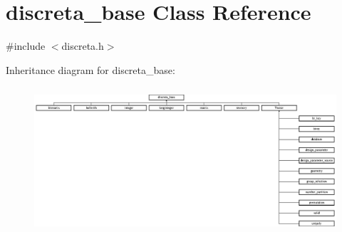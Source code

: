 \hypertarget{classdiscreta__base}{}\section{discreta\+\_\+base Class Reference}
\label{classdiscreta__base}


{\ttfamily \#include $<$discreta.\+h$>$}

Inheritance diagram for discreta\+\_\+base\+:\begin{figure}[H]
\begin{center}
\leavevmode
\includegraphics[height=5.449102cm]{classdiscreta__base}
\end{center}
\end{figure}
